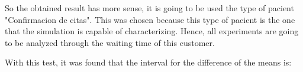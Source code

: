 So the obtained result has more sense, it is going to be used the type of pacient "Confirmacion de citas". This was chosen because this type of pacient is the one that the simulation is capable of characterizing. Hence, all experiments are going to be analyzed through the waiting time of this customer.

With this test, it was found that the interval for the difference of the means is:

\begin{equation}
    [-3.74976, 1.57127]
\end{equation}